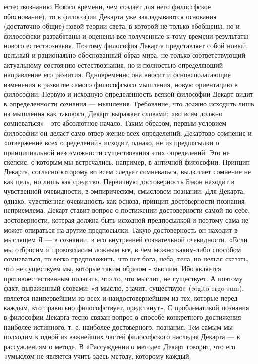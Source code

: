 \documentclass[12pt]{article}
\begin{document}
естествознанию Нового времени, чем создает для него философское обоснование), то в философии Декарта уже
закладываются основания (достаточно общие) новой теории света, в которой не только обобщены, но и
философски разработаны и оценены все полученные к тому времени результаты нового естествознания.
Поэтому философия Декарта представляет собой новый, цельный и рационально обоснованный образ мира, не
только соответствующий актуальному состоянию естествознания, но и полностью определяющий направление
его развития. Одновременно она вносит и основополагающие изменения в развитие самого философского
мышления, новую ориентацию в философии.
Первую и исходную определенность всякой философии Декарт видит в определенности сознания — мышления.
Требование, что должно исходить лишь из мышления как такового, Декарт выражает словами: «во всем должно
сомневаться» - это абсолютное начало. Таким образом, первым условием философии он делает само отвер-жение всех определений.
Декартово сомнение и «отвержение всех определений» исходит, однако, не из предпосылки о принципиальной
невозможности существования этих определений. Это не скепсис, с которым мы встречались, например, в
античной философии. Принцип Декарта, согласно которому во всем следует сомневаться, выдвигает сомнение
не как цель, но лишь как средство.
Первичную достоверность Бэкон находит в чувственной очевидности, в эмпирическом, смысловом познании.
Для Декарта, однако, чувственная очевидность как основа, принцип достоверности познания неприемлема.
Декарт ставит вопрос о постижении достоверности самой по себе, достоверности, которая должна быть
исходной предпосылкой и поэтому сама не может опираться на другие предпосылки. Такую достоверность он
находит в мыслящем Я — в сознании, в его внутренней сознательной очевидности. «Если мы отбросим и
провозгласим ложным все, в чем можно каким-либо способом сомневаться, то легко предположить, что нет
бога, неба, тела, но нельзя сказать, что не существуем мы, которые таким образом - мыслим. Ибо является
противоестественным полагать, что то, что мыслит, не существует. А поэтому факт, выраженный словами: «я
мыслю, значит, существую» (cogito ergo sum), является наипервейшим из всех и наидостовернейшим из тех,
которые перед каждым, кто правильно философствует, предстанут».
С проблематикой познания в философии Декарта тесно связан вопрос о способе конкретного достижения
наиболее истинного, т. е. наиболее достоверного, познания. Тем самым мы подходим к одной из важнейших
частей философского наследия Декарта — к рассуждениям о методе.
В «Рассуждении о методе» Декарт говорит, что его «умыслом не является учить здесь методу, которому каждый
\end{document}
